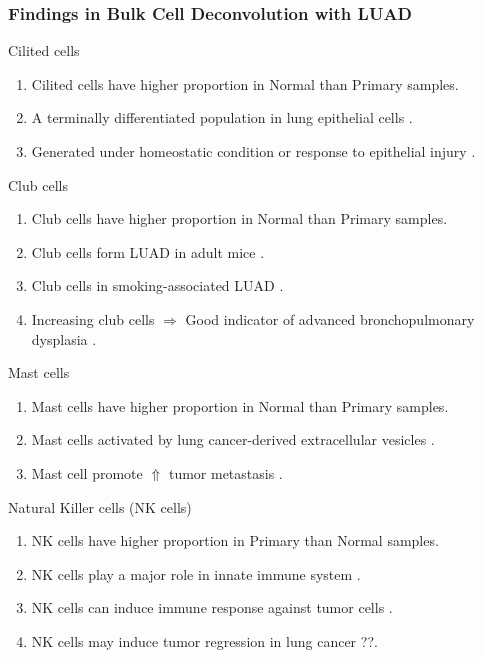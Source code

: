 \documentclass{beamer}
\begin{document}
    \begin{frame}[allowframebreaks]
        \frametitle{Findings in Bulk Cell Deconvolution with LUAD}

        \begin{block}{Cilited cells}
            \begin{enumerate}
                \item Cilited cells have higher proportion in Normal than Primary samples.
                \item A terminally differentiated population in lung epithelial cells \cite{ciliated-1}.
                \item Generated under homeostatic condition or response to epithelial injury \cite{ciliated-2}.
            \end{enumerate}
        \end{block}

        \begin{block}{Club cells}
            \begin{enumerate}
                \item Club cells have higher proportion in Normal than Primary samples.
                \item Club cells form LUAD in adult mice \cite{club-1}.
                \item Club cells in smoking-associated LUAD \cite{club-2}.
                \item Increasing club cells $\Rightarrow$ Good indicator of advanced bronchopulmonary dysplasia \cite{club-3}.
            \end{enumerate}
        \end{block}

        \begin{block}{Mast cells}
            \begin{enumerate}
                \item Mast cells have higher proportion in Normal than Primary samples.
                \item Mast cells activated by lung cancer-derived extracellular vesicles \cite{mast-1}.
                \item Mast cell promote $\Uparrow$ tumor metastasis \cite{mast-2}.
            \end{enumerate}
        \end{block}

        \begin{block}{Natural Killer cells (NK cells)}
            \begin{enumerate}
                \item NK cells have higher proportion in Primary than Normal samples.
                \item NK cells play a major role in innate immune system \cite{NK-2}.
                \item NK cells can induce immune response against tumor cells \cite{NK-2}.
                \item NK cells may induce tumor regression in lung cancer \cite{NK-1} ??.
            \end{enumerate}
        \end{block}


\end{frame}
\end{document}
